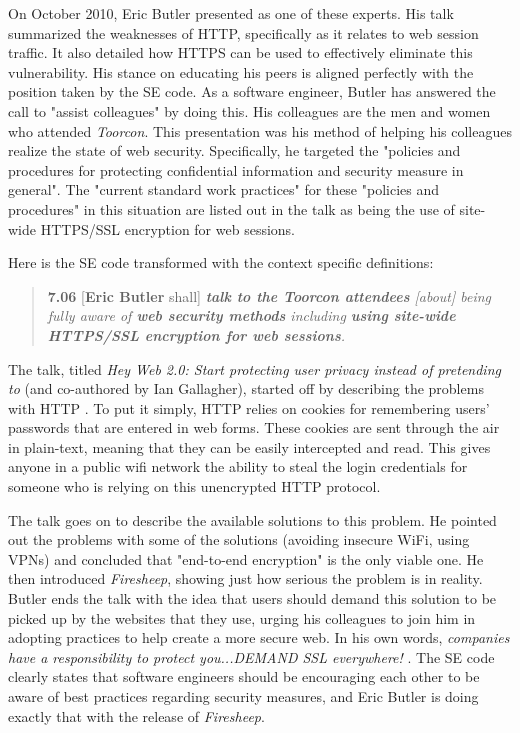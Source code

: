 \documentclass[11pt]{article}
\begin{document}
\begin{multicols}{2}
On October 2010, Eric Butler presented as one of these experts. His talk summarized the weaknesses of HTTP, specifically as it relates to web session traffic. It also detailed how HTTPS can be used to effectively eliminate this vulnerability. His stance on educating his peers is aligned perfectly with the position taken by the SE code. As a software engineer, Butler has answered the call to "assist colleagues" by doing this. His colleagues are the men and women who attended \emph{Toorcon}. This presentation was his method of helping his colleagues realize the state of web security. Specifically, he targeted the "policies and procedures for protecting confidential information and security measure in general". The "current standard work practices" for these "policies and procedures" in this situation are listed out in the talk as being the use of site-wide HTTPS/SSL encryption for web sessions.

Here is the SE code transformed with the context specific definitions:

\begin{quote}
  \textbf{7.06} [\textbf{Eric Butler} shall] \emph{\textbf{talk to the Toorcon attendees} [about] being fully aware of \textbf{web security methods} including \textbf{using site-wide HTTPS/SSL encryption for web sessions}.}
\end{quote}

The talk, titled \emph{Hey Web 2.0: Start protecting user privacy instead of pretending to} (and co-authored by Ian Gallagher), started off by describing the problems with HTTP \cite{toorcon_slides}. To put it simply, HTTP relies on cookies for remembering users' passwords that are entered in web forms. These cookies are sent through the air in plain-text, meaning that they can be easily intercepted and read. This gives anyone in a public wifi network the ability to steal the login credentials for someone who is relying on this unencrypted HTTP protocol.

The talk goes on to describe the available solutions to this problem. He pointed out the problems with some of the solutions (avoiding insecure WiFi, using VPNs) and concluded that "end-to-end encryption" is the only viable one. He then introduced \emph{Firesheep}, showing just how serious the problem is in reality. Butler ends the talk with the idea that users should demand this solution to be picked up by the websites that they use, urging his colleagues to join him in adopting practices to help create a more secure web. In his own words, \emph{companies have a responsibility to protect you...DEMAND SSL everywhere!} \cite{toorcon_slides}. The SE code clearly states that software engineers should be encouraging each other to be aware of best practices regarding security measures, and Eric Butler is doing exactly that with the release of \emph{Firesheep}.


\end{multicols}
\end{document}
